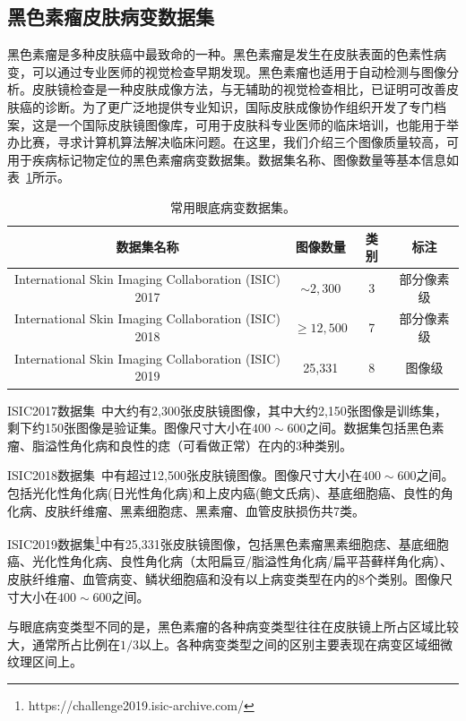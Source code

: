 \subsection{黑色素瘤皮肤病变数据集}\label{subsec:original_dermatoscope_ds_intro}
黑色素瘤是多种皮肤癌中最致命的一种。黑色素瘤是发生在皮肤表面的色素性病变，可以通过专业医师的视觉检查早期发现。黑色素瘤也适用于自动检测与图像分析。皮肤镜检查是一种皮肤成像方法，与无辅助的视觉检查相比，已证明可改善皮肤癌的诊断。为了更广泛地提供专业知识，国际皮肤成像协作组织开发了专门档案，这是一个国际皮肤镜图像库，可用于皮肤科专业医师的临床培训，也能用于举办比赛，寻求计算机算法解决临床问题。在这里，我们介绍三个图像质量较高，可用于疾病标记物定位的黑色素瘤病变数据集。数据集名称、图像数量等基本信息如表~\ref{tab:skin_datasets_info}所示。


\begin{table}[h]
	\centering
	\caption{常用眼底病变数据集。}		
	\label{tab:skin_datasets_info}
	\begin{tabular}{c|c|c|c}
		\toprule[2pt]
		数据集名称 & 图像数量 & 类别 & 标注 \\
		\midrule[2pt]
		International Skin Imaging Collaboration (ISIC) 2017 &  $\sim 2,300$ & 3 & 部分像素级 \\ \hline
		International Skin Imaging Collaboration (ISIC) 2018 & $\geq 12,500$ & 7  & 部分像素级 \\ \hline
		International Skin Imaging Collaboration (ISIC) 2019 & 25,331 & 8  & 图像级  \\ 
		\bottomrule[2pt]
	\end{tabular}
\end{table}

ISIC2017数据集~\cite{codella2018skin}中大约有2,300张皮肤镜图像，其中大约2,150张图像是训练集，剩下约150张图像是验证集。图像尺寸大小在$400\sim 600$之间。数据集包括黑色素瘤、脂溢性角化病和良性的痣（可看做正常）在内的3种类别。

ISIC2018数据集~\cite{codella2019skin, tschandl2018ham10000}中有超过12,500张皮肤镜图像。图像尺寸大小在$400\sim 600$之间。包括光化性角化病(日光性角化病)和上皮内癌(鲍文氏病)、基底细胞癌、良性的角化病、皮肤纤维瘤、黑素细胞痣、黑素瘤、血管皮肤损伤共7类。

ISIC2019数据集\footnote{https://challenge2019.isic-archive.com/}中有25,331张皮肤镜图像，包括黑色素瘤黑素细胞痣、基底细胞癌、光化性角化病、良性角化病（太阳扁豆/脂溢性角化病/扁平苔藓样角化病）、皮肤纤维瘤、血管病变、鳞状细胞癌和没有以上病变类型在内的8个类别。图像尺寸大小在$400\sim 600$之间。

与眼底病变类型不同的是，黑色素瘤的各种病变类型往往在皮肤镜上所占区域比较大，通常所占比例在$1/3$以上。各种病变类型之间的区别主要表现在病变区域细微纹理区间上。

